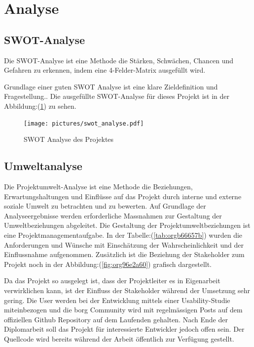 \cleardoublepage
\section{Analyse}
\label{sec:org61eed6c}
\subsection{SWOT-Analyse}
\label{sec:orgd8cfd66}

Die SWOT-Analyse ist eine Methode die Stärken, Schwächen, Chancen und
Gefahren zu erkennen, indem eine 4-Felder-Matrix ausgefüllt wird.

Grundlage einer guten SWOT Analyse ist eine klare Zieldefinition und
Fragestellung.. Die ausgefüllte SWOT-Analyse für dieses Projekt ist in der
Abbildung:(\ref{fig:org1eae858}) zu sehen.

\begin{figure}[htbp]
\centering
\texttt{[image: pictures/swot\_analyse.pdf]}
\caption{\label{fig:org1eae858}
SWOT Analyse des Projektes}
\end{figure}

\subsection{Umweltanalyse}
\label{sec:org9d9bddc}

Die Projektumwelt-Analyse ist eine Methode die Beziehungen,
Erwartungshaltungen und Einflüsse auf das Projekt durch interne und
externe soziale Umwelt zu betrachten und zu bewerten. Auf Grundlage
der Analyseergebnisse werden erforderliche Massnahmen zur Gestaltung
der Umweltbeziehungen abgeleitet. Die Gestaltung der
Projektumweltbeziehungen ist eine Projektmanagementaufgabe.
\pagebreak
In der Tabelle:(\ref{tab:orgb66657b}) wurden die Anforderungen und Wünsche mit
Einschätzung der Wahrscheinlichkeit und der Einflussnahme aufgenommen.
Zusätzlich ist die Beziehung der Stakeholder zum Projekt noch in der
Abbildung:(\ref{fig:org96e2a60}) grafisch dargestellt.

Da das Projekt so ausgelegt ist, dass der Projektleiter es in Eigenarbeit
verwirklichen kann, ist der Einfluss der Stakeholder während der Umsetzung sehr
gering. Die User werden bei der Entwicklung mittels einer
Usability-Studie miteinbezogen und die \gls{borg} Community wird mit
regelmässigen Posts auf dem offiziellen Github Repository auf dem Laufenden
gehalten. Nach Ende der Diplomarbeit soll das Projekt für interessierte
Entwickler jedoch offen sein. Der Quellcode wird bereits während der Arbeit
öffentlich zur Verfügung gestellt.

